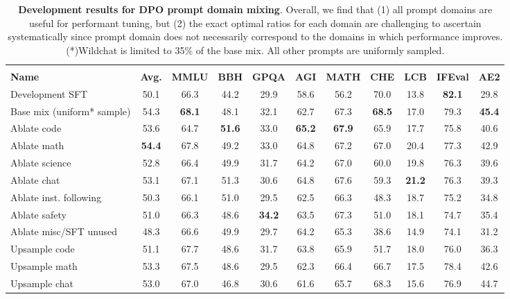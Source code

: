 \documentclass[table]{ai2style/ai2}
\newcommand{\newOlmo}{Olmo\xspace}
\newcommand{\olmothreeinstruct}{\textsc{\newOlmo~3 Instruct}\xspace}
\begin{document}
{{\begin{table}[ht]
\centering
\small
\begin{tabular}{@{}l >{\columncolor{ai2pink!18}}c ccccccccc@{}}
\toprule
& \multicolumn{10}{c}{\textbf{Subset of \olmothreeinstruct Benchmarks}} \\
\cmidrule(lr){2-11}
\textbf{Name} & \cellcolor{ai2pink!18}\textbf{Avg.} & \textbf{MMLU} & \textbf{BBH} & \textbf{GPQA} & \textbf{AGI} & \textbf{MATH} & \textbf{CHE} & \textbf{LCB} & \textbf{IFEval} & \textbf{AE2} \\
\midrule
Development SFT  & 50.1 & 66.3 & 44.2 & 29.9 & 58.6 & 56.2 & 70.0 & 13.8 & {\bf{82.1}} & 29.8 \\
Base mix (uniform* sample) & 54.3 & {\bf{68.1}} & 48.1 & 32.1 & 62.7 & 67.3 & {\bf{68.5}} & 17.0 & 79.3 & {\bf{45.4}} \\
\midrule
Ablate code & 53.6 & 64.7 & {\bf{51.6}} & 33.0 & {\bf{65.2}} & {\bf{67.9}} & 65.9 & 17.7 & 75.8 & 40.6 \\
Ablate math & {\bf{54.4}} & 67.8 & 49.2 & 33.0 & 64.8 & 67.2 & 67.0 & 20.4 & 77.3 & 42.9 \\
Ablate science & 52.8 & 66.4 & 49.9 & 31.7 & 64.2 & 67.0 & 60.0 & 19.8 & 76.3 & 39.6 \\
Ablate chat & 53.1 & 67.1 & 51.3 & 30.6 & 64.8 & 67.6 & 59.3 & {\bf{21.2}} & 76.3 & 39.3 \\
Ablate inst. following & 50.3 & 66.1 & 51.0 & 29.5 & 62.5 & 66.3 & 48.3 & 18.7 & 75.2 & 34.8 \\
Ablate safety & 51.0 & 66.3 & 48.6 & {\bf{34.2}} & 63.5 & 67.3 & 51.0 & 18.1 & 74.7 & 35.4 \\
Ablate misc/SFT unused & 48.3 & 66.6 & 49.9 & 29.7 & 64.2 & 65.3 & 38.6 & 14.9 & 74.1 & 31.2 \\
\midrule
Upsample code & 51.1 & 67.7 & 48.6 & 31.7 & 63.8 & 65.9 & 51.7 & 18.0 & 76.0 & 36.3 \\
Upsample math & 53.3 & 67.5 & 48.6 & 29.5 & 62.3 & 66.4 & 66.7 & 17.5 & 78.4 & 42.6 \\
Upsample chat & 53.0 & 67.0 & 46.8 & 30.6 & 61.6 & 65.7 & 68.3 & 15.6 & 76.9 & 44.7 \\
\bottomrule
\end{tabular}
\caption{\textbf{Development results for DPO prompt domain mixing}. Overall, we find that (1) all prompt domains are useful for performant tuning, but (2) the exact optimal ratios for each domain are challenging to ascertain systematically since prompt domain does not necessarily correspond to the domains in which performance improves. (*)Wildchat is limited to 35\% of the base mix. All other prompts are uniformly sampled.}
\label{tab:dpo_mixing_exps}
\end{table}

}}
\end{document}
